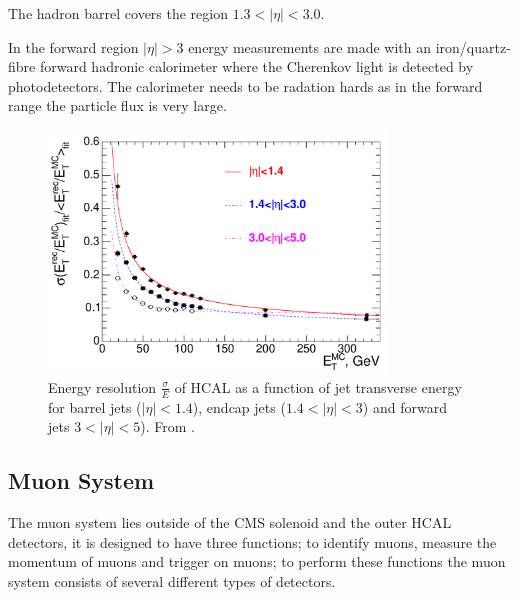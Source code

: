 The hadron barrel covers the region $1.3 < |\eta| < 3.0$.

In the forward region $|\eta| > 3$ energy measurements are made with an
iron/quartz-fibre forward hadronic calorimeter where the Cherenkov light is
detected by photodetectors. The calorimeter needs to be radation hards as in the
forward range the particle flux is very large.

\begin{figure}[htb!]
  \centering
  \includegraphics[width=0.8\textwidth]{hcal_performance}
  \caption{Energy resolution $\frac{\sigma}{E}$ of HCAL as a function of jet
  \label{fig:HCAL}
transverse energy for barrel jets ($|\eta| < 1.4$), endcap jets ($1.4<|\eta| <
3$) and forward jets $3<|\eta| < 5$). From \cite{cms}.}
\end{figure}


\subsection{Muon System}
The muon system lies outside of the CMS solenoid and the outer HCAL detectors,
it is designed to have three functions; to identify muons, measure the momentum
of muons and trigger on muons; to perform these functions the muon system
consists of several different types of detectors.

